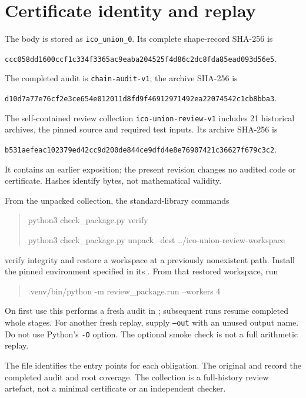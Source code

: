 \documentclass[11pt,a4paper]{article}
\begin{document}
\appendix
\section{Certificate identity and replay}\label{app:replay}
The body is stored as \texttt{ico\_union\_0}. Its complete shape-record SHA-256 is
\begin{center}\small
\nolinkurl{ccc058dd1600ccf1c334f3365ac9eaba204525f4d86c2dc8fda85ead093d56e5}.
\end{center}
The completed audit is \texttt{chain-audit-v1}; the archive SHA-256 is
\begin{center}\small
\nolinkurl{d10d7a77e76cf2e3ce654e012011d8fd9f46912971492ea22074542c1cb8bba3}.
\end{center}
The self-contained review collection \texttt{ico-union-review-v1} includes
21 historical archives, the pinned source and required test inputs. Its
archive SHA-256 is
\begin{center}\small
\nolinkurl{b531aefeac102379ed42cc9d200de844ce9dfd4e8e76907421c36627f679c3c2}.
\end{center}
It contains an earlier exposition; the present revision changes no audited
code or certificate. Hashes identify bytes, not mathematical validity.

From the unpacked collection, the standard-library commands
\begin{quote}\small\ttfamily
python3 check\_package.py verify\par
python3 check\_package.py unpack --dest ../ico-union-review-workspace
\end{quote}
verify integrity and restore a workspace at a previously nonexistent path.
Install the pinned environment specified in its . From that
restored workspace, run
\begin{quote}\small\ttfamily
.venv/bin/python -m review\_package.run --workers 4
\end{quote}
On first use this performs a fresh audit in ;
subsequent runs resume completed whole stages. For another fresh replay,
supply \texttt{--out} with an unused output name. Do not use Python's
\texttt{-O} option. The optional smoke check is not a full arithmetic replay.

The  file identifies the entry points for each obligation.
The original  and
 record the completed audit
and root coverage. The collection is a full-history review artefact, not a
minimal certificate or an independent checker.
\end{document}
